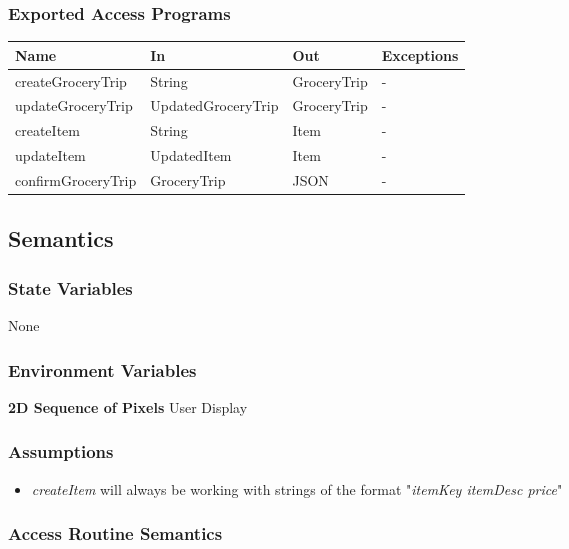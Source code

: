 \documentclass[12pt, titlepage]{article}
\begin{document}
\subsubsection{Exported Access Programs}

\begin{center}
  \begin{tabular}{p{5cm} p{4cm} p{3cm} p{4cm}}
  \hline
  \textbf{Name} & \textbf{In} & \textbf{Out} & \textbf{Exceptions} \\
  \hline
  createGroceryTrip & String & GroceryTrip & -\\
  updateGroceryTrip & UpdatedGroceryTrip & GroceryTrip & -\\
  createItem & String & Item & -\\
  updateItem & UpdatedItem & Item & -\\
  confirmGroceryTrip & GroceryTrip & JSON & -\\
  \hline
  \end{tabular}
\end{center}

\subsection{Semantics}

\subsubsection{State Variables}

None

\subsubsection{Environment Variables}

\textbf{2D Sequence of Pixels} User Display

\subsubsection{Assumptions}
\begin{itemize}
  \item \textit{createItem} will always be working with strings of the format "\textit{itemKey itemDesc price}"
\end{itemize}

\subsubsection{Access Routine Semantics}
\end{document}
